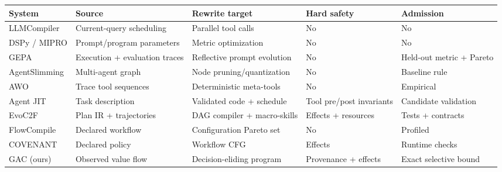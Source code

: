 \begin{tabularx}{\linewidth}{@{}l >{\raggedright\arraybackslash}X >{\raggedright\arraybackslash}X >{\raggedright\arraybackslash}X >{\raggedright\arraybackslash}X@{}}
\toprule
System & Source & Rewrite target & Hard safety & Admission \\
\midrule
LLMCompiler & Current-query scheduling & Parallel tool calls & No & No \\
DSPy / MIPRO & Prompt\slash{}program parameters & Metric optimization & No & No \\
GEPA & Execution + evaluation traces & Reflective prompt evolution & No & Held-out metric + Pareto \\
AgentSlimming & Multi-agent graph & Node pruning\slash{}quantization & No & Baseline rule \\
AWO & Trace tool sequences & Deterministic meta-tools & No & Empirical \\
Agent JIT & Task description & Validated code + schedule & Tool pre/post invariants & Candidate validation \\
EvoC2F & Plan IR + trajectories & DAG compiler + macro-skills & Effects + resources & Tests + contracts \\
FlowCompile & Declared workflow & Configuration Pareto set & No & Profiled \\
COVENANT & Declared policy & Workflow CFG & Effects & Runtime checks \\
GAC (ours) & Observed value flow & Decision-eliding program & Provenance + effects & Exact selective bound \\
\bottomrule
\end{tabularx}
